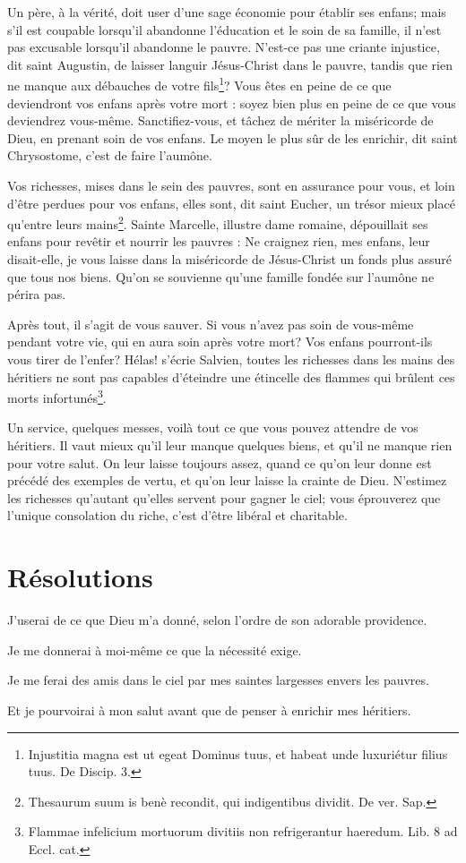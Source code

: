 \documentclass[instructions.tex]{subfiles}
\begin{document}
Un père, à la vérité, doit user d'une sage économie pour établir ses enfans; mais s'il est coupable lorsqu'il abandonne l'éducation et le soin de sa famille, il n'est pas excusable lorsqu'il abandonne le pauvre. N'est-ce pas une criante injustice, dit saint Augustin, de laisser languir Jésus-Christ dans le pauvre, tandis que rien ne manque aux débauches de votre fils\footnote{Injustitia magna est ut egeat Dominus tuus, et habeat unde luxuriétur filius tuus. De Discip. 3.}? Vous êtes en peine de ce que deviendront vos enfans après votre mort : soyez bien plus en peine de ce que vous deviendrez vous-même. Sanctifiez-vous, et tâchez de mériter la miséricorde de Dieu, en prenant soin de vos enfans. Le moyen le plus sûr de les enrichir, dit saint Chrysostome, c'est de faire l'aumône.
 
Vos richesses, mises dans le sein des pauvres, sont en assurance pour vous, et loin d'être perdues pour vos enfans, elles sont, dit saint Eucher, un trésor mieux placé qu'entre leurs mains\footnote{Thesaurum suum is benè recondit, qui indigentibus dividit. De ver. Sap.}. Sainte Marcelle, illustre dame romaine, dépouillait ses enfans pour revêtir et nourrir les pauvres : Ne craignez rien, mes enfans, leur disait-elle, je vous laisse dans la miséricorde de Jésus-Christ un fonds plus assuré que tous nos biens. Qu'on se souvienne qu'une famille fondée sur l'aumône ne périra pas.
 
Après tout, il s'agit de vous sauver. Si vous n'avez pas soin de vous-même pendant votre vie, qui en aura soin après votre mort? Vos enfans pourront-ils vous tirer de l'enfer? Hélas! s'écrie Salvien, toutes les richesses dans les mains des héritiers ne sont pas capables d'éteindre une étincelle des flammes qui brûlent ces morts infortunés\footnote{Flammae infelicium mortuorum divitiis non refrigerantur haeredum. Lib. 8 ad Eccl. cat.}.
 
Un service, quelques messes, voilà tout ce que vous pouvez attendre de vos héritiers. Il vaut mieux qu'il leur manque quelques biens, et qu'il ne manque rien pour votre salut. On leur laisse toujours assez, quand ce qu'on leur donne est précédé des exemples de vertu, et qu'on leur laisse la crainte de Dieu. N'estimez les richesses qu'autant qu'elles servent pour gagner le ciel; vous éprouverez que l'unique consolation du riche, c'est d'être libéral et charitable.
 
\section{Résolutions}
 
\primo J'userai de ce que Dieu m'a donné, selon l'ordre de son adorable providence. 

\secundo Je me donnerai à moi-même ce que la nécessité exige.

\tertio Je me ferai des amis dans le ciel par mes saintes largesses envers les pauvres. 

\quarto Et je pourvoirai à mon salut avant que de penser à enrichir mes héritiers. 
 
\end{document}
